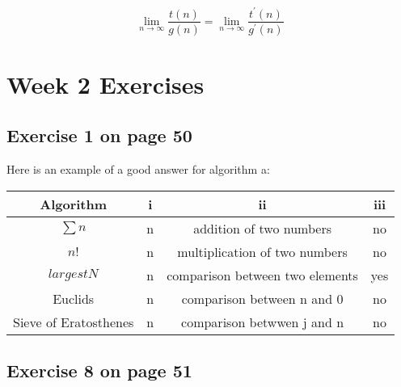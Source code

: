 \documentclass[12pt]{amsart}
\begin{document}
   \[\lim_{n \rightarrow \infty} \frac{t(n)}{g(n)} = \lim_{n \rightarrow \infty} \frac{t^{\prime}(n)}{g^{\prime}(n)}\]
















\section{Week 2 Exercises}
\subsection{ Exercise 1 on page 50} $ $\\ 

Here is an example of a good answer for algorithm a:
  
  \begin{center}
\begin{tabular}{ |c|c|c|c| } 
 \hline
 \textbf{Algorithm} & \textbf{i} & \textbf{ii} & \textbf{iii} \\ 
 \hline
 $\sum{n}$ & n & addition of two numbers & no \\ 
 \hline
 $n!$ & n &multiplication of two numbers & no\\ 
 \hline
 $largestN$ & n & comparison between two elements & yes \\ 
 \hline
Euclids & n & comparison between n and 0& no \\
 \hline
Sieve of Eratosthenes & n & comparison betwwen j and n & no \\  
 \hline
\end{tabular}
\end{center}

\subsection{Exercise 8 on page 51} $ $\\ 
\end{document}

